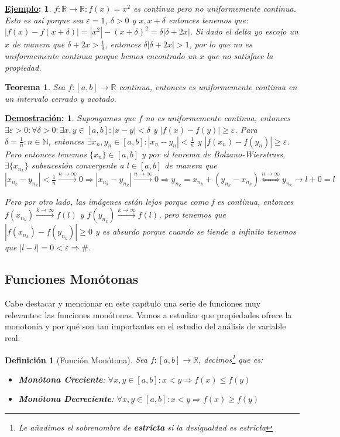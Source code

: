 \documentclass[10pt,a4paper,openright]{book}
\theoremstyle{break}
\newtheorem*{defi}{Definición}
\newtheorem*{theo}{Teorema}
\newtheorem*{demo}{\underline{Demostración}:}
\newtheorem*{ej}{\underline{Ejemplo}:}
\begin{document}
\begin{ej}
$f: \mathbb R \rightarrow \mathbb R: f(x)=x^2$ es continua pero no uniformemente continua. Esto es así porque sea $\varepsilon=1$, $\delta >0$ y $x,x+\delta$ entonces tenemos que: $|f(x)-f(x+\delta)|=|x^2|-(x+\delta)^2=\delta|\delta +2x|$. Si dado el delta yo escojo un $x$ de manera que $\delta +2x > \frac{1}{\delta}$, entonces $\delta|\delta +2x|>1$, por lo que no es uniformemente continua porque hemos encontrado un $x$ que no satisface la propiedad.
\end{ej}

\begin{theo}
Sea $f:[a,b]\rightarrow \mathbb R$ continua, entonces es uniformemente continua en un intervalo cerrado y acotado.
\end{theo}
\begin{demo}
Supongamos que $f$ no es uniformemente continua, entonces $\exists \varepsilon> 0: \forall \delta>0: \exists x,y\in [a,b]: |x-y|<\delta$ y $|f(x)-f(y)|\geq \varepsilon$. Para $\delta = \frac{1}{n}: n\in \mathbb N$, entonces $\exists x_n, y_n\in [a,b]: |x_n-y_n|<\frac{1}{n}$ y $|f(x_n)-f(y_n)|\geq \varepsilon$. Pero entonces tenemos $\{x_n\}\in [a,b]$ y por el teorema de Bolzano-Wierstrass, $\exists \{x_{n_k}\}$ subsucesión convergente a $l\in [a,b]$ de manera que $|x_{n_k}-y_{n_k}| < \frac{1}{n} \xrightarrow{n\rightarrow \infty} 0\Rightarrow |x_{n_k}-y_{n_k}|\xrightarrow{n\rightarrow \infty} 0\Rightarrow y_{n_k}=x_{n_k}+(y_{n_k}-x_{n_k})\stackrel{n\rightarrow \infty}{\Leftrightarrow} y_{n_k}\rightarrow l+0=l$

Pero por otro lado, las imágenes están lejos porque como f es continua, entonces $f(x_{n_k})\xrightarrow{k\rightarrow \infty}f(l)$ y $f(y_{n_k})\xrightarrow{k\rightarrow \infty}f(l)$, pero tenemos que $|f(x_{n_k})-f(y_{n_k})|\geq 0$ y es absurdo porque cuando se tiende a infinito tenemos que $|l-l|=0<\varepsilon\Rightarrow \#$.
\end{demo}

\subsection{Funciones Monótonas}
Cabe destacar y mencionar en este capítulo una serie de funciones muy relevantes: las funciones monótonas. Vamos a estudiar que propiedades ofrece la monotonía y por qué son tan importantes en el estudio del análisis de variable real. 

\begin{defi}[Función Monótona]
Sea $f:[a,b]\rightarrow \mathbb R$, decimos\footnote{Le añadimos el sobrenombre de \textbf{estricta} si la desigualdad es estricta} que es:
\begin{itemize}
\item \textbf{Monótona Creciente}: $\forall x,y\in [a,b]: x<y\Rightarrow f(x)\leq f(y)$
\item \textbf{Monótona Decreciente}: $\forall x,y\in [a,b]: x<y\Rightarrow f(x)\geq f(y)$
\end{itemize}
\end{defi}
\end{document}
